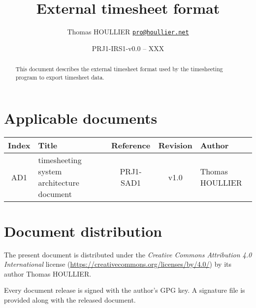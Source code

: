 \documentclass[letterpaper]{article}
\title{External timesheet format}
\author{Thomas HOULLIER \href{mailto:pro@houllier.net}
         {\texttt{\textlangle pro@houllier.net\textrangle}}}
\begin{document}
\frenchspacing
\date{PRJ1-IRS1-v0.0 -- XXX}
\maketitle
\thispagestyle{FirstPage}

\begin{abstract}
  This document describes the external timesheet format used by the
  timesheeting program to export timesheet data.
\end{abstract}

\begin{versionhistory}
\end{versionhistory}
\setcounter{table}{0} %

\section*{Applicable documents}
{ \centering
  \begin{tabularx}{\textwidth}{| c | X | c | c | X |} \hline
    Index & Title & Reference & Revision & Author \\ \hline
    AD1 & timesheeting system architecture document & PRJ1-SAD1 & v1.0 & Thomas
    HOULLIER \\ \hline
  \end{tabularx} \par }

\section*{Document distribution}
The present document is distributed under the \emph{Creative Commons Attribution
  4.0 International} license (\url{https://creativecommons.org/licenses/by/4.0/})
by its author Thomas HOULLIER.

Every document release is signed with the author's GPG key. A signature file
is provided along with the released document.

\tableofcontents
\printglossary[type=\acronymtype,style=index]
\pagestyle{plain}


\appendix


\apptocmd{\thebibliography}{\raggedright}{}{}
\begingroup
{}
\setlength\bibitemsep{0pt}
\printbibliography
\endgroup
\end{document}
